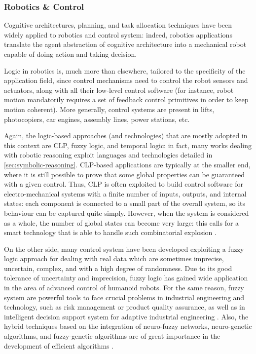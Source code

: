 \documentclass[12pt,a4paper,openright,twoside]{book}
\begin{document}
\subsubsection{Robotics \& Control}

Cognitive architectures, planning, and task allocation techniques have been widely applied to robotics and control system: indeed, robotics applications translate the agent abstraction of cognitive architecture into a mechanical robot capable of doing action and taking decision.

Logic in robotics is, much more than elsewhere, tailored to the specificity of the application field, since control mechanisms need to control the robot sensors and actuators, along with all their low-level control software (for instance, robot motion mandatorily requires a set of feedback control primitives in order to keep motion coherent).
%
More generally, control systems are present in lifts, photocopiers, car engines, assembly lines, power stations, etc.

Again, the logic-based approaches (and technologies) that are mostly adopted in this context are CLP, fuzzy logic, and temporal logic: in fact, many works dealing with robotic reasoning \cite{Ferrein2008} exploit languages and technologies detailed in \cref{sec:symbolic-reasoning}.
%
CLP-based applications are typically at the smaller end, where it is still possible to prove that some global properties can be guaranteed with a given control.
%
Thus, CLP is often exploited to build control software for electro-mechanical systems with a finite number of inputs, outputs, and internal states: each component is connected to a small part of the overall system, so its behaviour can be captured quite simply.
%
However, when the system is considered as a whole, the number of global states can become very large: this calls for a smart technology that is able to handle such combinatorial explosion \cite{lytras2008}.

On the other side, many control system have been developed exploiting a fuzzy logic approach for dealing with real data which are sometimes imprecise, uncertain, complex, and with a high degree of randomness.
%
Due to its good tolerance of uncertainty and imprecision, fuzzy logic has gained wide application in the area of advanced control of humanoid robots.
%
For the same reason, fuzzy system are powerful tools to face crucial problems in industrial engineering
and technology, such as risk management or product quality assurance, as well as in intelligent decision support system for adaptive industrial engineering \cite{chilwal2020,rastogi2015,patil2012,zhu2004,center1998}.
%
Also, the hybrid techniques based on the integration of neuro-fuzzy networks, neuro-genetic algorithms, and fuzzy-genetic algorithms are of great importance in the development of efficient algorithms \cite{Tahmasebi2012}.
\end{document}
